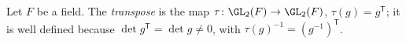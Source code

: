 Let $F$ be a field. The \emph{transpose} is the map $\tau\colon\GL_2(F)\to\GL_2(F)$, $\tau(g)=g^{\mathsf T}$; it is well defined because $\det g^{\mathsf T}=\det g\neq0$, with $\tau(g)^{-1}=(g^{-1})^{\mathsf T}$.
